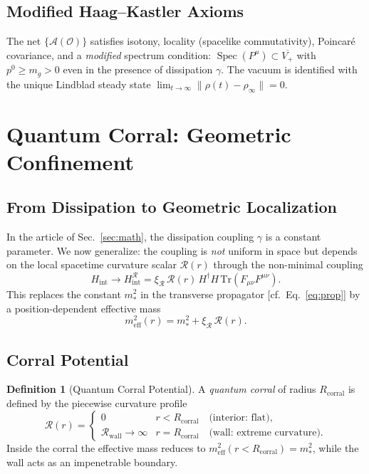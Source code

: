 \documentclass[aps,prd,reprint,superscriptaddress,floatfix]{revtex4-2}
\theoremstyle{definition}
\newtheorem{definition}[theorem]{Definition}
\newcommand{\Traza}{\mathrm{Tr}}
\newcommand{\eff}{_{\mathrm{eff}}}
\newcommand{\corr}{_{\mathrm{corral}}}
\DeclareMathOperator{\Spec}{Spec}
\begin{document}
\subsection{Modified Haag--Kastler Axioms}

The net $\{\mathcal{A}(\mathcal{O})\}$ satisfies isotony, locality
(spacelike commutativity), Poincar\'e covariance, and a \emph{modified}
spectrum condition: $\Spec(P^\mu)\subset\overline{V_+}$ with
$p^0\geq m_g>0$ even in the presence of dissipation $\gamma$. The vacuum
is identified with the unique Lindblad steady state
$\lim_{t\to\infty}\|\rho(t)-\rho_\infty\|=0$.

\section{Quantum Corral: Geometric Confinement}
\label{sec:corral}

\subsection{From Dissipation to Geometric Localization}

In the article of Sec.~\ref{sec:math}, the dissipation coupling $\gamma$
is a constant parameter. We now generalize: the coupling is \emph{not}
uniform in space but depends on the local spacetime curvature scalar
$\mathcal{R}(r)$ through the non-minimal coupling \cite{Birrell1982}
\begin{equation}
  H_{\mathrm{int}}\to H_{\mathrm{int}}^{\mathcal{R}}
  =\xi_{\mathcal{R}}\,\mathcal{R}(r)\,H^\dagger H\,
  \Traza(F_{\mu\nu}F^{\mu\nu}).
  \label{eq:curvature_coupling}
\end{equation}
This replaces the constant $m_*^2$ in the transverse propagator
[cf.\ Eq.~\eqref{eq:prop}] by a position-dependent effective mass
\begin{equation}
  m\eff^2(r) = m_*^2 + \xi_{\mathcal{R}}\,\mathcal{R}(r).
  \label{eq:meff}
\end{equation}

\subsection{Corral Potential}

\begin{definition}[Quantum Corral Potential]
\label{def:corral}
A \emph{quantum corral} of radius $R\corr$ is defined by the piecewise
curvature profile
\begin{equation}
  \mathcal{R}(r)=
  \begin{cases}
    0        & r < R\corr\quad\text{(interior: flat)},\\
    \mathcal{R}_{\mathrm{wall}}\to\infty
             & r = R\corr\quad\text{(wall: extreme curvature)}.
  \end{cases}
  \label{eq:corral_potential}
\end{equation}
Inside the corral the effective mass reduces to $m\eff^2(r<R\corr)=m_*^2$,
while the wall acts as an impenetrable boundary.
\end{definition}
\end{document}
